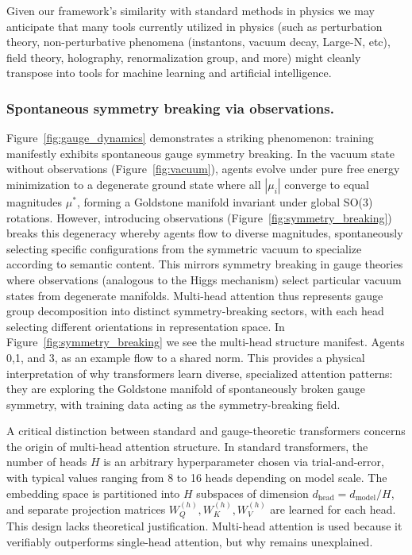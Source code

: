\documentclass[twoside,11pt]{article}
\begin{document}
Given our framework's similarity with standard methods in physics we may anticipate that many tools currently utilized in physics (such as perturbation theory, non-perturbative phenomena (instantons, vacuum decay, Large-N, etc), field theory, holography, renormalization group, and more) might cleanly transpose into tools for machine learning and artificial intelligence.

\subsubsection{Spontaneous symmetry breaking via observations.}

Figure~\ref{fig:gauge_dynamics} demonstrates a striking phenomenon: training manifestly exhibits spontaneous gauge symmetry breaking. In the vacuum state without observations (Figure~\ref{fig:vacuum}), agents evolve under pure free energy minimization to a degenerate ground state where all $|\mu_i|$ converge to equal magnitudes $\mu^*$, forming a Goldstone manifold invariant under global SO(3) rotations. However, introducing observations (Figure~\ref{fig:symmetry_breaking}) breaks this degeneracy whereby agents flow to diverse magnitudes, spontaneously selecting specific configurations from the symmetric vacuum to specialize according to semantic content. This mirrors symmetry breaking in gauge theories where observations (analogous to the Higgs mechanism) select particular vacuum states from degenerate manifolds. Multi-head attention thus represents gauge group decomposition into distinct symmetry-breaking sectors, with each head selecting different orientations in representation space. In Figure~\ref{fig:symmetry_breaking} we see the multi-head structure manifest. Agents 0,1, and 3, as an example flow to a shared norm. This provides a physical interpretation of why transformers learn diverse, specialized attention patterns: they are exploring the Goldstone manifold of spontaneously broken gauge symmetry, with training data acting as the symmetry-breaking field.


A critical distinction between standard and gauge-theoretic transformers concerns the origin of multi-head attention structure. In standard transformers, the number of heads $H$ is an arbitrary hyperparameter chosen via trial-and-error, with typical values ranging from 8 to 16 heads depending on model scale. The embedding space is partitioned into $H$ subspaces of dimension $d_{\text{head}} = d_{\text{model}}/H$, and separate projection matrices $W_Q^{(h)}, W_K^{(h)}, W_V^{(h)}$ are learned for each head. This design lacks theoretical justification. Multi-head attention is used because it verifiably outperforms single-head attention, but why remains unexplained.
\end{document}
